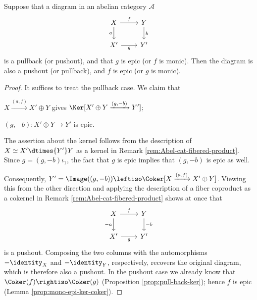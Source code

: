 \begin{proposition}\label{prop:Abel-cat-pull-push}
	Suppose that a diagram in an abelian category $\mathcal{A}$
	\[\begin{tikzcd}
		X \arrow[r, "f"] \arrow[d, "a"'] & Y \arrow[d, "b"] \\
		X' \arrow[r, "g"'] & Y'
	\end{tikzcd}\]
	is a pullback (or pushout), and that $g$ is epic (or $f$ is monic). Then the
	diagram is also a pushout (or pullback), and $f$ is epic (or $g$ is monic).
\end{proposition}
\begin{proof}
	It suffices to treat the pullback case. We claim that
	\begin{compactitem}
		\item $X\xrightarrow{(a,f)}X'\oplus Y$ gives
		$\Ker[X'\oplus Y\xrightarrow{(g,-b)}Y']$;
		\item $(g,-b):X'\oplus Y\to Y'$ is epic.
	\end{compactitem}

	The assertion about the kernel follows from the description of
	$X\simeq X'\dtimes{Y'}Y$ as a kernel in Remark
	\ref{rem:Abel-cat-fibered-product}. Since $g=(g,-b)\iota_1$, the fact that
	$g$ is epic implies that $(g,-b)$ is epic as well.

	Consequently,
	$Y'=\Image((g,-b))\leftiso\Coker[X\xrightarrow{(a,f)}X'\oplus Y]$.
	Viewing this from the other direction and applying the description of a
	fiber coproduct as a cokernel in Remark
	\ref{rem:Abel-cat-fibered-product} shows at once that
	\[\begin{tikzcd}
		X \arrow[r, "f"] \arrow[d, "-a"'] & Y \arrow[d, "-b"] \\
		X' \arrow[r, "g"'] & Y'
	\end{tikzcd}\]
	is a pushout. Composing the two columns with the automorphisms
	$-\identity_X$ and $-\identity_Y$, respectively, recovers the original
	diagram, which is therefore also a pushout. In the pushout case we already
	know that $\Coker(f)\rightiso\Coker(g)$ (Proposition
	\ref{prop:pull-back-ker}); hence $f$ is epic (Lemma
	\ref{prop:mono-epi-ker-coker}).
\end{proof}

